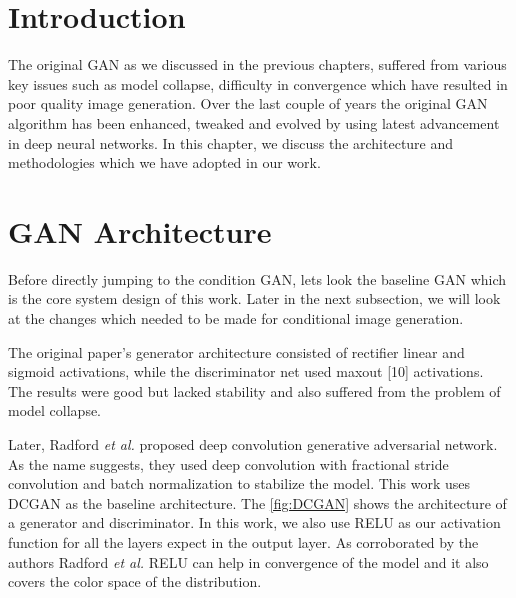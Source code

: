 
\section{Introduction}
The original GAN as we discussed in the previous chapters, suffered from various key issues such as model collapse, difficulty in convergence which have resulted in poor quality image generation. Over the last couple of years the original GAN algorithm has been enhanced, tweaked and evolved by using latest advancement in deep neural networks. In this chapter, we discuss the architecture and methodologies which we have adopted in our work.  


\section{GAN Architecture} 

Before directly jumping to the condition GAN, lets look the baseline GAN which is the core system design of this work. Later in the next subsection, we will look at the changes which needed to be made for conditional image generation. 
\par
The original paper's\cite{Original-GAN} generator architecture consisted of rectifier linear\cite{RELU} and sigmoid activations, while the discriminator net used maxout [10] activations. The results were good but lacked stability and also suffered from the problem of model collapse.
\par
Later, Radford \textit{et al.}\cite{DCGAN} proposed deep convolution generative adversarial network. As the name suggests, they used deep convolution with fractional stride convolution and batch normalization to stabilize the model. This work uses DCGAN as the baseline architecture. The \cref{fig:DCGAN} shows the architecture of a generator and discriminator. In this work, we also use RELU as our activation function for all the layers expect in the output layer. As corroborated by the authors Radford \textit{et al.}\cite{DCGAN} RELU can help in convergence of the model and it also covers the color space of the distribution.
\par

